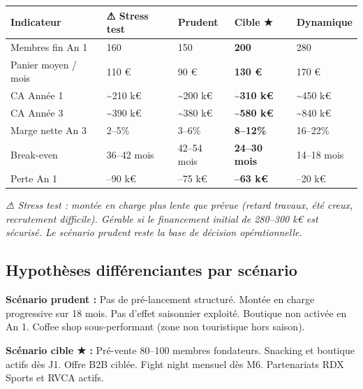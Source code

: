 \documentclass[11pt, a4paper]{article}
\newcommand{\redcell}[1]{\textcolor{fc-red}{\textbf{#1}}}
\begin{document}
\begin{center}
\begin{tabular}{@{}p{3.5cm}p{2.6cm}p{2.6cm}p{2.6cm}p{2.6cm}@{}}
\toprule
\rowcolor{fc-ink}\color{white}\textbf{Indicateur} & \color{white}\textbf{⚠ Stress test} & \color{white}\textbf{Prudent} & \color{white}\textbf{Cible ★} & \color{white}\textbf{Dynamique} \\
\midrule
Membres fin An 1 & 160 & 150 & \redcell{200} & 280 \\
\rowcolor{fc-bg2} Panier moyen / mois & 110 € & 90 € & \redcell{130 €} & 170 € \\
CA Année 1 & \textasciitilde210 k€ & \textasciitilde200 k€ & \redcell{\textasciitilde310 k€} & \textasciitilde450 k€ \\
\rowcolor{fc-bg2} CA Année 3 & \textasciitilde390 k€ & \textasciitilde380 k€ & \redcell{\textasciitilde580 k€} & \textasciitilde840 k€ \\
Marge nette An 3 & 2–5\% & 3–6\% & \redcell{8–12\%} & 16–22\% \\
\rowcolor{fc-bg2} Break-even & 36–42 mois & 42–54 mois & \redcell{24–30 mois} & 14–18 mois \\
Perte An 1 & \textcolor{fc-red}{–90 k€} & \textcolor{fc-red}{–75 k€} & \redcell{–63 k€} & –20 k€ \\
\bottomrule
\end{tabular}
\end{center}

\vspace{6pt}
{\small\color{fc-ink3}\textit{⚠ Stress test : montée en charge plus lente que prévue (retard travaux, été creux, recrutement difficile). Gérable si le financement initial de 280–300 k€ est sécurisé. Le scénario prudent reste la base de décision opérationnelle.}}

\subsection{Hypothèses différenciantes par scénario}

\textbf{Scénario prudent :} Pas de pré-lancement structuré. Montée en charge progressive sur 18 mois. Pas d'effet saisonnier exploité. Boutique non activée en An 1. Coffee shop sous-performant (zone non touristique hors saison).

\textbf{Scénario cible ★ :} Pré-vente 80–100 membres fondateurs. Snacking et boutique actifs dès J1. Offre B2B ciblée. Fight night mensuel dès M6. Partenariats RDX Sports et RVCA actifs.
\end{document}
